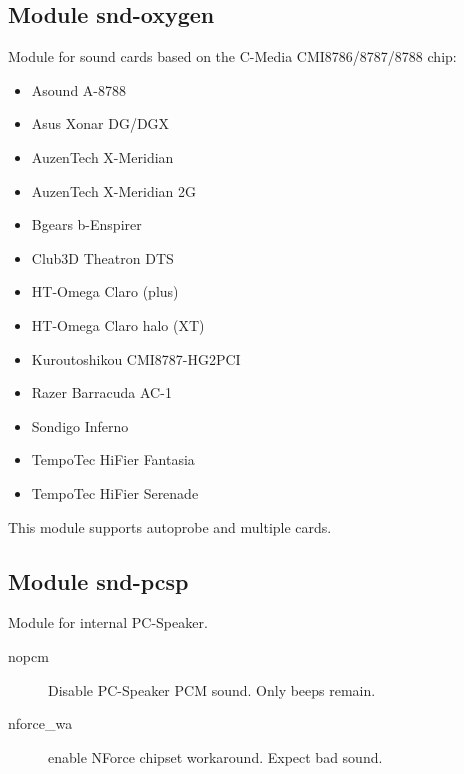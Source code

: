 \documentclass[a4paper,8pt,english]{sphinxmanual}
\begin{document}
\subsection{Module snd-oxygen}
\label{sound/alsa-configuration:module-snd-oxygen}
Module for sound cards based on the C-Media CMI8786/8787/8788 chip:
\begin{itemize}
\item {} 
Asound A-8788

\item {} 
Asus Xonar DG/DGX

\item {} 
AuzenTech X-Meridian

\item {} 
AuzenTech X-Meridian 2G

\item {} 
Bgears b-Enspirer

\item {} 
Club3D Theatron DTS

\item {} 
HT-Omega Claro (plus)

\item {} 
HT-Omega Claro halo (XT)

\item {} 
Kuroutoshikou CMI8787-HG2PCI

\item {} 
Razer Barracuda AC-1

\item {} 
Sondigo Inferno

\item {} 
TempoTec HiFier Fantasia

\item {} 
TempoTec HiFier Serenade

\end{itemize}

This module supports autoprobe and multiple cards.


\subsection{Module snd-pcsp}
\label{sound/alsa-configuration:module-snd-pcsp}
Module for internal PC-Speaker.
\begin{description}
\item[{nopcm}] \leavevmode
Disable PC-Speaker PCM sound. Only beeps remain.

\item[{nforce\_wa}] \leavevmode
enable NForce chipset workaround. Expect bad sound.

\end{description}
\end{document}
